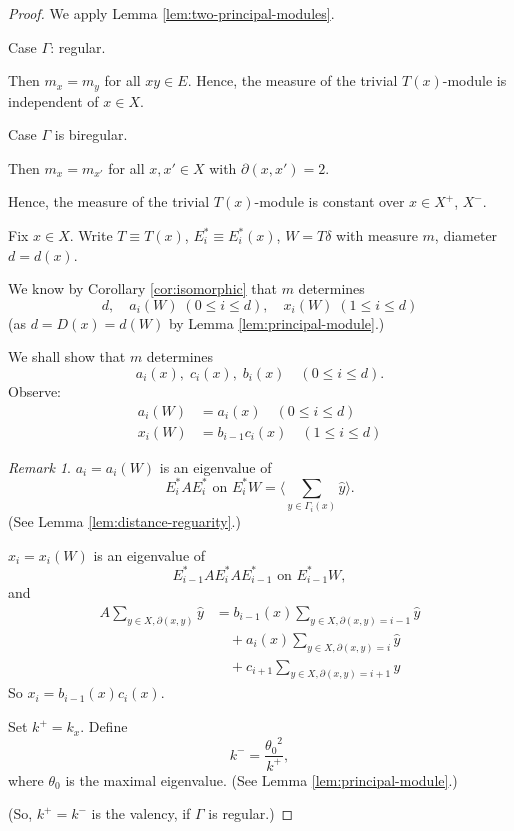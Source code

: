 \documentclass[
]{book}
\theoremstyle{definition}
\theoremstyle{definition}
\theoremstyle{definition}
\theoremstyle{definition}
\theoremstyle{remark}
\newtheorem*{remark}{Remark}
\begin{document}
\begin{proof}
We apply Lemma \ref{lem:two-principal-modules}.

Case \(\Gamma\): regular.

Then \(m_x = m_y\) for all \(xy\in E\). Hence, the measure of the trivial \(T(x)\)-module is independent of \(x\in X\).

Case \(\Gamma\) is biregular.

Then \(m_x = m_{x'}\) for all \(x, x'\in X\) with \(\partial(x,x') = 2\).

Hence, the measure of the trivial \(T(x)\)-module is constant over \(x\in X^+\), \(X^-\).

Fix \(x\in X\). Write \(T\equiv T(x)\), \(E^*_i \equiv E^*_i(x)\), \(W = T\delta\) with measure \(m\), diameter \(d = d(x)\).

We know by Corollary \ref{cor:isomorphic} that \(m\) determines
\[d, \quad a_i(W) \; (0\leq i\leq d), \quad x_i(W) \; (1\leq i\leq d)\]
(as \(d = D(x) = d(W)\) by Lemma \ref{lem:principal-module}.)

We shall show that \(m\) determines
\[a_i(x), \;  c_i(x), \; b_i(x) \quad (0\leq i\leq d).\]
Observe:
\begin{align}
a_i(W) & = a_i(x) \quad (0\leq i\leq d)\\
x_i(W) & = b_{i-1}c_i(x) \quad (1\leq i\leq d)
\end{align}

\begin{remark}
\(a_i = a_i(W)\) is an eigenvalue of
\[E^*_iAE^*_i \text{ on } E^*_iW = \langle \sum_{y\in \Gamma_i(x)}\hat{y}\rangle. \]
(See Lemma \ref{lem:distance-reguarity}.)

\(x_i = x_i(W)\) is an eigenvalue of
\[E^*_{i-1}AE^*_iAE^*_{i-1} \text{ on } E^*_{i-1}W,\]
and
\begin{align}
A\sum_{y\in X,\partial(x,y)}\hat{y} & = b_{i-1}(x)\sum_{y\in X, \partial(x,y)=i-1}\hat{y} \\
& \quad + a_i(x)\sum_{y\in X, \partial(x,y)=i}\hat{y} \\
& \quad + c_{i+1}\sum_{y\in X, \partial(x,y)=i+1}\hat{y}
\end{align}
So \(x_i = b_{i-1}(x)c_i(x)\).
\end{remark}

Set \(k^+ = k_x\). Define
\[k^- = \frac{{\theta_0}^2}{k^+},\]
where \(\theta_0\) is the maximal eigenvalue. (See Lemma \ref{lem:principal-module}.)

(So, \(k^+ = k^-\) is the valency, if \(\Gamma\) is regular.)


\end{proof}
\end{document}
